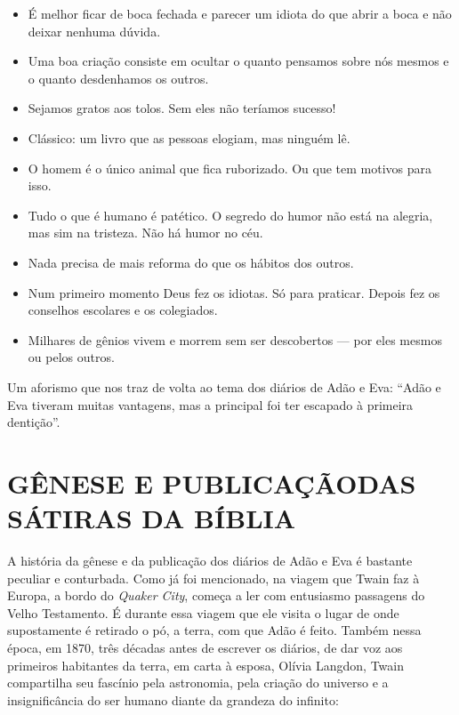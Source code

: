 \begin{itemize}
\item É melhor ficar de boca fechada e parecer um idiota do que abrir a
boca e não deixar nenhuma dúvida.

\item Uma boa criação consiste em ocultar o quanto pensamos sobre nós
mesmos e o quanto desdenhamos os outros.

\item Sejamos gratos aos tolos. Sem eles não teríamos sucesso!

\item Clássico: um livro que as pessoas elogiam, mas ninguém lê.

\item O homem é o único animal que fica ruborizado. Ou que tem motivos para
isso.

\item Tudo o que é humano é patético. O segredo do humor não está na
alegria, mas sim na tristeza. Não há humor no céu.

\item Nada precisa de mais reforma do que os hábitos dos outros.

\item Num primeiro momento Deus fez os idiotas. Só para praticar. Depois
fez os conselhos escolares e os colegiados.

\item Milhares de gênios vivem e morrem sem ser descobertos --- por eles
mesmos ou pelos outros.
\end{itemize}

Um aforismo que nos traz de volta ao tema dos diários de Adão e Eva:
``Adão e Eva tiveram muitas vantagens, mas a principal foi ter
escapado à primeira dentição''.

\section{GÊNESE E PUBLICAÇÃO\break DAS SÁTIRAS DA BÍBLIA}

A história da gênese e da publicação dos diários de Adão e Eva é bastante
peculiar e conturbada. Como já foi mencionado, na viagem que
Twain faz à Europa, a bordo do \textit{Quaker City}, começa a ler com entusiasmo
passagens do Velho Testamento. É durante essa viagem que ele visita o lugar de
onde supostamente é retirado o pó, a terra, com que Adão é feito. Também
nessa época, em 1870, três décadas antes de escrever os diários, de dar voz
aos primeiros habitantes da terra, em carta à esposa, Olívia Langdon,
Twain compartilha seu fascínio pela astronomia, pela criação do universo e
a insignificância do ser humano diante da grandeza do infinito:

